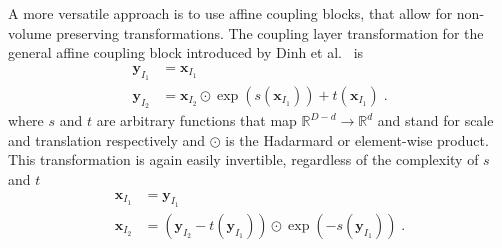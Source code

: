 A more versatile approach is to use affine coupling blocks, that allow for
non-volume preserving transformations. The coupling layer transformation for
the general affine coupling block introduced by Dinh et
al.~\citep{dinhDensityEstimationUsing2017} is
\begin{equation}
    \begin{aligned}%
        \label{eq:affine_coupling_transform}
        \mathbf{y}_{I_1} &= \mathbf{x}_{I_1} \\
        \mathbf{y}_{I_2} &= \mathbf{x}_{I_2} \odot \exp ( s(\mathbf{x}_{I_1}))
        + t(\mathbf{x}_{I_1})\;.
    \end{aligned}
\end{equation}
where $s$ and $t$ are arbitrary functions that map $\mathbb{R}^{D-d}
\rightarrow \mathbb{R}^d$ and stand for scale and translation respectively and
$\odot$ is the Hadarmard or element-wise product.
This transformation is again easily invertible, regardless of the complexity of
$s$ and $t$
\begin{equation}
    \begin{aligned}%
        \label{eq:inv_affine_coupling_transform}
        \mathbf{x}_{I_1} &= \mathbf{y}_{I_1} \\
        \mathbf{x}_{I_2} &= (\mathbf{y}_{I_2} - t(\mathbf{y}_{I_1})) \odot \exp
        (-s(\mathbf{y}_{I_1}))\;.
    \end{aligned}
\end{equation}

